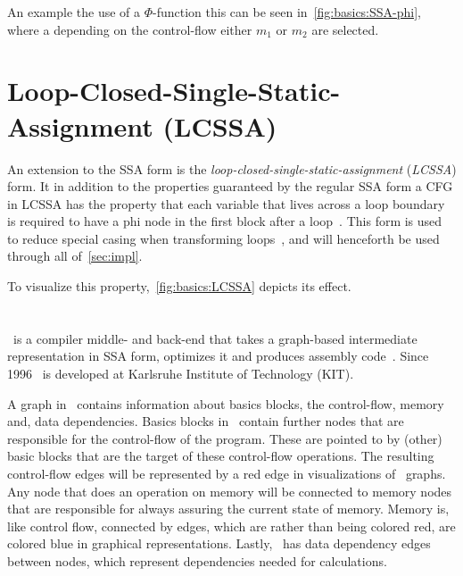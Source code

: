 An example the use of a $\Phi$-function this can be seen in~\cref{fig:basics:SSA-phi}, where a depending on the control-flow either $m_1$ or $m_2$ are selected.




\section{Loop-Closed-Single-Static-Assignment (LCSSA)}\label{sec:basics:LCSSA}

An extension to the SSA form is the \textit{loop-closed-single-static-assignment} (\textit{LCSSA}) form.
It in addition to the properties guaranteed by the regular SSA form a CFG in LCSSA has the property that each variable that lives across a loop boundary is required to have a phi node in the first block after a loop~\cite{LLVM_LCSSA}\cite{gcc_lcssa}.
This form is used to reduce special casing when transforming loops~\cite{aebi18bachelorarbeit}, and will henceforth be used through all of~\cref{sec:impl}.

To visualize this property,~\cref{fig:basics:LCSSA} depicts its effect.



\section{\libFIRM}\label{sec:basics:firm}

\libFIRM~is a compiler middle- and back-end that takes a graph-based intermediate representation in SSA form, optimizes it and produces assembly code~\cite{libfirm}.
Since 1996 \libFIRM~is developed at Karlsruhe Institute of Technology (KIT).

A graph in \libFIRM~contains information about basics blocks, the control-flow, memory and, data dependencies.
Basics blocks in \libFIRM~contain further nodes that are responsible for the control-flow of the program.
These are pointed to by (other) basic blocks that are the target of these control-flow operations.
The resulting control-flow edges will be represented by a red edge in visualizations of \libFIRM~graphs.
Any node that does an operation on memory will be connected to memory nodes that are responsible for always assuring the current state of memory.
Memory is, like control flow, connected by edges, which are rather than being colored red, are colored blue in graphical representations.
Lastly, \libFIRM~has data dependency edges between nodes, which represent dependencies needed for calculations.

